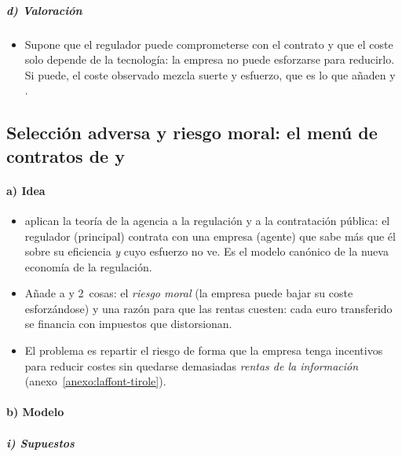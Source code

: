 \documentclass[11pt]{article}
\begin{document}
\subparagraph{d) Valoración}

\begin{itemize}
\item Supone que el regulador puede comprometerse con el contrato y que el coste solo depende de la tecnología: la empresa no puede esforzarse para reducirlo. Si puede, el coste observado mezcla suerte y esfuerzo, que es lo que añaden  y .
\end{itemize}

\subsection{Selección adversa y riesgo moral:\cortetitulo{} el menú de contratos de  y }\label{sec:laffont-tirole}

\paragraph{a) Idea}

\begin{itemize}
\item \textcite{LaffontTirole1986Using} aplican la teoría de la agencia a la regulación y a la contratación pública: el regulador (principal) contrata con una empresa (agente) que sabe más que él sobre su eficiencia \emph{y} cuyo esfuerzo no ve\nocite{LaffontTirole1993Theory}. Es el modelo canónico de la nueva economía de la regulación.
\item Añade a  y  2~cosas: el \emph{riesgo moral} (la empresa puede bajar su coste esforzándose) y una razón para que las rentas cuesten: cada euro transferido se financia con impuestos que distorsionan.
\item El problema es repartir el riesgo de forma que la empresa tenga incentivos para reducir costes sin quedarse demasiadas \emph{rentas de la información} (anexo~\ref{anexo:laffont-tirole}).
\end{itemize}

\paragraph{b) Modelo}

\subparagraph{i) Supuestos}
\end{document}
